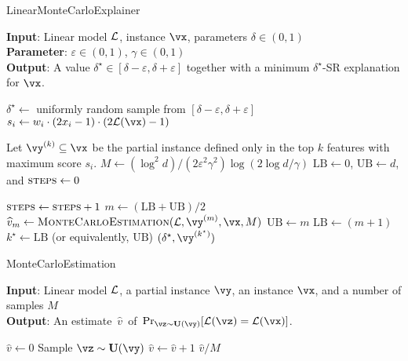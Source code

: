 \renewcommand{\algorithmiccomment}[1]{\; \; \texttt{/* #1 */}}
\begin{algorithm}[tb]
	\caption{LinearMonteCarloExplainer}
	\label{alg:algorithm}
	\textbf{Input}: Linear model $\mathcal{L}$, instance $\vx$, parameters $\delta \in (0, 1)$\\
	\textbf{Parameter}:  $\varepsilon \in (0, 1)$,  $\gamma \in (0, 1)$\\
	\textbf{Output}: A value $\delta^\star \in [\delta-\varepsilon, \delta+\varepsilon]$ together with a minimum $\delta^\star$-SR explanation for $\vx$.\\
	\begin{algorithmic}[1] %
	\STATE $\delta^\star \gets$ uniformly random sample from $[\delta-\varepsilon, \delta + \varepsilon]$ \label{line:delta}
		\STATE $s_i \gets  w_i \cdot (2x_i - 1) \cdot (2\Lin(\vx) - 1)$
	\ENDFOR
	
		\STATE  Let $\vy^{(k)} \subseteq \vx$ be the partial instance defined only in the top $k$ features with maximum score $s_i$.\label{line:greedy}
	\ENDFOR
	\STATE $M \gets (\log^2{d})/(2\varepsilon^2 \gamma^2) \log(2 \log d / \gamma)$\label{line:mdef}
	\STATE $\textrm{LB} \gets 0$, $\textrm{UB} \gets d$, and $\textsc{steps} \gets 0$

	\label{line:while}
		\STATE $\textsc{steps} \gets \textsc{steps} + 1$\label{line:steps}
		\STATE $m \gets \left(\textrm{LB} + \textrm{UB} \right)/2$
		\STATE $\widehat{v}_m \gets \textsc{MonteCarloEstimation}(\Lin, \vy^{(m)}, \vx, M)$ \label{line:montecarlo}
			\STATE $\textrm{UB} \gets m$
		\ELSE
			\STATE $\textrm{LB} \gets (m+1)$
		\ENDIF
	\ENDWHILE\label{line:endwhile}
	\STATE $k^\star \gets \textrm{LB}$ (or equivalently, $\textrm{UB}$)
	\RETURN $(\delta^\star, \vy^{(k^\star)})$
	\end{algorithmic}
	\end{algorithm}


\begin{algorithm}[tb]
	\caption{MonteCarloEstimation}	\label{alg:montecarlo}
	\textbf{Input}: Linear model $\mathcal{L}$, a partial instance $\vy$, an instance $\vx$, and a number of samples $M$\\
	\textbf{Output}: An estimate~$\widehat{v}$~of~$\Pr_{\vz \sim \U(\vy)}[\Lin(\vz)=\Lin(\vx)]$.\\
	\begin{algorithmic}[1]
	\STATE $\widehat{v} \gets 0$
		\STATE Sample $\vz \sim \U(\vy)$
		\IF {$\Lin(\vz) = \Lin(\vx)$}
			\STATE $\widehat{v} \gets \widehat{v} + 1$
		\ENDIF
	\ENDFOR
	 \RETURN $\widehat{v}/M$
\end{algorithmic}
\end{algorithm}


